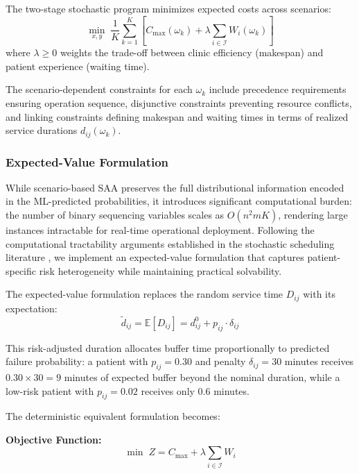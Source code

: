 The two-stage stochastic program minimizes expected costs across scenarios:
\begin{equation}
\min_{x, y} \; \frac{1}{K} \sum_{k=1}^{K} \left[ C_{\max}(\omega_k) + \lambda \sum_{i \in \mathcal{I}} W_i(\omega_k) \right]
\label{eq:saa_objective}
\end{equation}
where $\lambda \geq 0$ weights the trade-off between clinic efficiency (makespan) and patient experience (waiting time).

The scenario-dependent constraints for each $\omega_k$ include precedence requirements ensuring operation sequence, disjunctive constraints preventing resource conflicts, and linking constraints defining makespan and waiting times in terms of realized service durations $d_{ij}(\omega_k)$.

\subsubsection{Expected-Value Formulation}

While scenario-based SAA preserves the full distributional information encoded in the ML-predicted probabilities, it introduces significant computational burden: the number of binary sequencing variables scales as $O(n^2 m K)$, rendering large instances intractable for real-time operational deployment. Following the computational tractability arguments established in the stochastic scheduling literature \citep{denton2003sequential, mancilla2012sample}, we implement an expected-value formulation that captures patient-specific risk heterogeneity while maintaining practical solvability.

The expected-value formulation replaces the random service time $D_{ij}$ with its expectation:
\begin{equation}
\tilde{d}_{ij} = \mathbb{E}[D_{ij}] = d_{ij}^0 + p_{ij} \cdot \delta_{ij}
\label{eq:expected_duration}
\end{equation}

This risk-adjusted duration allocates buffer time proportionally to predicted failure probability: a patient with $p_{ij} = 0.30$ and penalty $\delta_{ij} = 30$ minutes receives $0.30 \times 30 = 9$ minutes of expected buffer beyond the nominal duration, while a low-risk patient with $p_{ij} = 0.02$ receives only 0.6 minutes.

The deterministic equivalent formulation becomes:

\textbf{Objective Function:}
\begin{equation}
\min \; Z = C_{\max} + \lambda \sum_{i \in \mathcal{I}} W_i
\label{eq:objective}
\end{equation}

